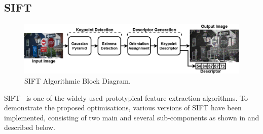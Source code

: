 \subsection{SIFT}
\begin{figure}[tb]
    \centering
     \includegraphics[width=\columnwidth]{Images/AlgorithmDiagram.png}
    \caption{SIFT Algorithmic Block Diagram.}
    \label{fig:SIFTBlockDiagram}
\end{figure}
SIFT~\cite{lowe2004distinctive} is one of the widely used prototypical feature extraction algorithms. To demonstrate the proposed optimisations, various versions of SIFT have been implemented, consisting of two main and several sub-components as shown in  and described below.

